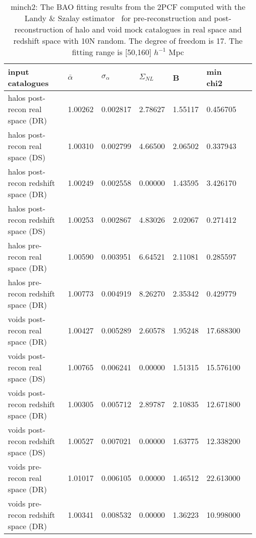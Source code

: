 \begin{table*}
\caption{minch2: The BAO fitting results from the 2PCF computed with the Landy $\&$ Szalay estimator~\cite{Landy1993} for pre-reconstruction and  post-reconstruction of halo and void mock catalogues in real space and redshift space with 10N random. The degree of freedom is 17. The fitting range is [50,160] $h^{-1}$ Mpc}
\label{tab:LS}
\begin{tabular}{lllllll}
\hline
input catalogues &  $\bar{\alpha}$ &  $\sigma_{\alpha}$ &       $\Sigma_{NL}$ &        B &  min chi2 \\
\hline
halos post-recon real space (DR)     & 1.00262 & 0.002817 & 2.78627 & 1.55117 &  0.456705 \\
halos post-recon real space (DS)     & 1.00310 & 0.002799 & 4.66500 & 2.06502 &  0.337943 \\
halos post-recon redshift space (DR) & 1.00249 & 0.002558 & 0.00000 & 1.43595 &  3.426170 \\
halos post-recon redshift space (DS) & 1.00253 & 0.002867 & 4.83026 & 2.02067 &  0.271412 \\
halos pre-recon real space (DR)      & 1.00590 & 0.003951 & 6.64521 & 2.11081 &  0.285597 \\
halos pre-recon redshift space (DR)  & 1.00773 & 0.004919 & 8.26270 & 2.35342 &  0.429779 \\
\hline
voids post-recon real space (DR)     & 1.00427 & 0.005289 & 2.60578 & 1.95248 & 17.688300 \\
voids post-recon real space (DS)     & 1.00765 & 0.006241 & 0.00000 & 1.51315 & 15.576100 \\
voids post-recon redshift space (DR) & 1.00305 & 0.005712 & 2.89787 & 2.10835 & 12.671800 \\
voids post-recon redshift space (DS) & 1.00527 & 0.007021 & 0.00000 & 1.63775 & 12.338200 \\
voids pre-recon real space (DR)      & 1.01017 & 0.006105 & 0.00000 & 1.46512 & 22.613000 \\
voids pre-recon redshift space (DR)  & 1.00341 & 0.008532 & 0.00000 & 1.36223 & 10.998000 \\
\hline
\end{tabular}
\end{table*}

